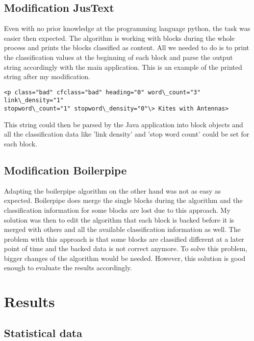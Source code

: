\subsection{Modification JusText}
\label{subsec:Modification JusText}

Even with no prior knowledge at the programming language python, the task was easier then expected. The algorithm is working with blocks during the whole process and prints the blocks classified as content. All we needed to do is to print the classification values at the beginning of each block and parse the output string accordingly with the main application.
This is an example of the printed string after my modification. \linebreak

\begin{lstlisting}
<p class="bad" cfclass="bad" heading="0" word\_count="3" link\_density="1" 
stopword\_count="1" stopword\_density="0"\> Kites with Antennas>
\end{lstlisting}

This string could then be parsed by the Java application into block objects and all the classification data like 'link density' and 'stop word count' could be set for each block.


\subsection{Modification Boilerpipe}

Adapting the boilerpipe algorithm on the other hand was not as easy as expected. Boilerpipe does merge the single blocks during the algorithm and the classification information for some blocks are lost due to this approach. My solution was then to edit the algorithm that each block is backed before it is merged with others and all the available classification information as well. The problem with this approach is that some blocks are classified different at a later point of time and the backed data is not correct anymore. To solve this problem, bigger changes of the algorithm would be needed. However, this solution is good enough to evaluate the results accordingly.


\section{Results}


\subsection{Statistical data}

